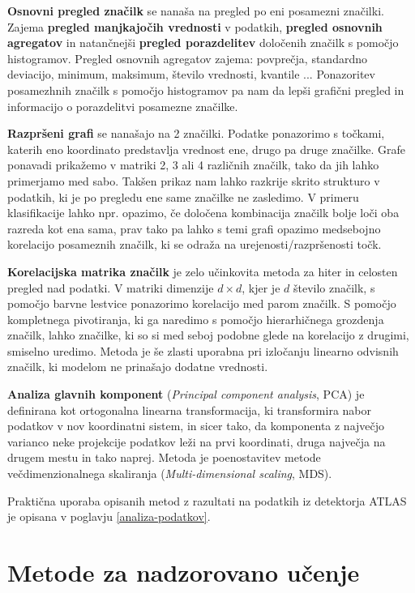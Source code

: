 \documentclass[11pt,a4paper,openany]{book}
\begin{document}
\textbf{Osnovni pregled značilk} se nanaša na pregled po eni posamezni značilki. Zajema \textbf{pregled manjkajočih vrednosti} v podatkih, \textbf{pregled osnovnih agregatov} in natančnejši \textbf{pregled porazdelitev} določenih značilk s pomočjo histogramov. Pregled osnovnih agregatov zajema: povprečja, standardno deviacijo, minimum, maksimum, število vrednosti, kvantile ... Ponazoritev posamezhnih značilk s pomočjo histogramov pa nam da lepši grafični pregled in informacijo o porazdelitvi posamezne značilke.

\textbf{Razpršeni grafi} se nanašajo na 2 značilki. Podatke ponazorimo s točkami, katerih eno koordinato predstavlja vrednost ene, drugo pa druge značilke. Grafe ponavadi prikažemo v matriki 2, 3 ali 4 različnih značilk, tako da jih lahko primerjamo med sabo. Takšen prikaz nam lahko razkrije skrito strukturo v podatkih, ki je po pregledu ene same značilke ne zasledimo. V primeru klasifikacije lahko npr. opazimo, če določena kombinacija značilk bolje loči oba razreda kot ena sama, prav tako pa lahko s temi grafi opazimo medsebojno korelacijo posameznih značilk, ki se odraža na urejenosti/razpršenosti točk.

\textbf{Korelacijska matrika značilk} je zelo učinkovita metoda za hiter in celosten pregled nad podatki. V matriki dimenzije $d \times d$, kjer je $d$ število značilk, s pomočjo barvne lestvice ponazorimo korelacijo med parom značilk. S pomočjo kompletnega pivotiranja, ki ga naredimo s pomočjo hierarhičnega grozdenja značilk, lahko značilke, ki so si med seboj podobne glede na korelacijo z drugimi, smiselno uredimo. Metoda je še zlasti uporabna pri izločanju linearno odvisnih značilk, ki modelom ne prinašajo dodatne vrednosti. 

\textbf{Analiza glavnih komponent} (\textit{Principal component analysis}, PCA) je definirana kot ortogonalna linearna transformacija, ki transformira nabor podatkov v nov koordinatni sistem, in sicer tako, da komponenta z največjo varianco neke projekcije podatkov leži na prvi koordinati, druga največja na drugem mestu in tako naprej. Metoda je poenostavitev metode večdimenzionalnega skaliranja (\textit{Multi-dimensional scaling}, MDS).

Praktična uporaba opisanih metod z razultati na podatkih iz detektorja ATLAS je opisana v poglavju \ref{analiza-podatkov}.

\section{Metode za nadzorovano učenje}
\end{document}
